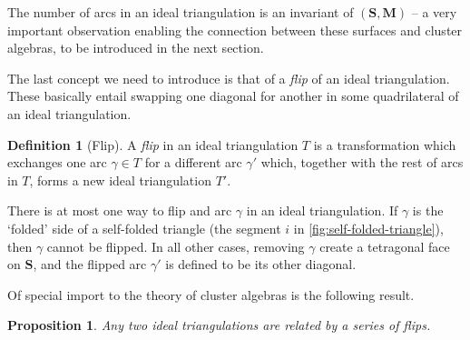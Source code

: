 \documentclass[a4paper,oneside,svgnames,draft]{amsart}
\theoremstyle{plain}
\newtheorem{proposition}[theorem]{Proposition}
\theoremstyle{definition}
\newtheorem{definition}[theorem]{Definition}
\begin{document}
 The number of arcs in an ideal triangulation is an invariant of
 $(\mathbf{S},\mathbf{M})$ -- a very important observation enabling the
 connection between these surfaces and cluster algebras, to be introduced in the
 next section.

 The last concept we need to introduce is that of a \emph{flip} of an ideal
 triangulation. These basically entail swapping one diagonal for another in some
 quadrilateral of an ideal triangulation.

 \begin{definition}[Flip]
  A \emph{flip} in an ideal triangulation $T$ is a transformation which
  exchanges one arc $\gamma \in T$ for a different arc $\gamma'$ which, together
  with the rest of arcs in $T$, forms a new ideal triangulation $T'$.
 \end{definition}

 There is at most one way to flip and arc $\gamma$ in an ideal triangulation. If
 $\gamma$ is the `folded' side of a self-folded triangle (the segment $i$ in
 \cref{fig:self-folded-triangle}), then $\gamma$ cannot be flipped. In all other
 cases, removing $\gamma$ create a tetragonal face on $\mathbf{S}$, and the
 flipped arc $\gamma'$ is defined to be its other diagonal.

 Of special import to the theory of cluster algebras is the following result.

 \begin{proposition}
  Any two ideal triangulations are related by a series of flips.
 \end{proposition}
\end{document}
